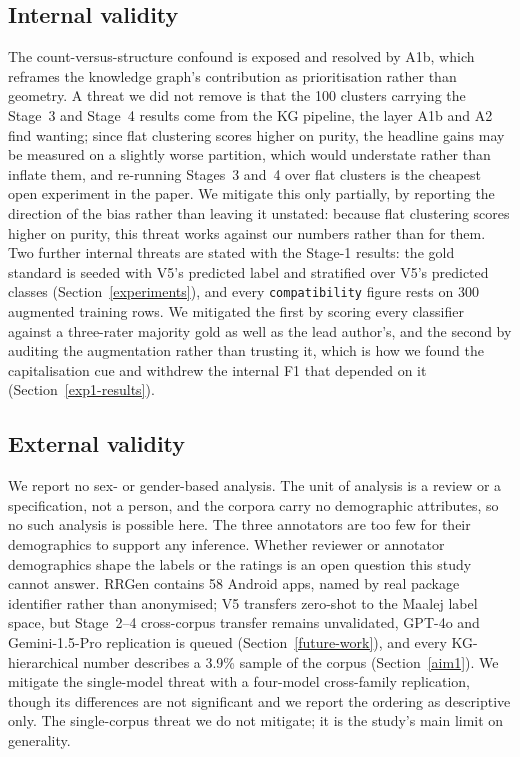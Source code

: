 \documentclass[preprint,12pt]{elsarticle}
\begin{document}
\subsection{Internal validity} The count-versus-structure confound is exposed and resolved by A1b, which reframes the knowledge graph's contribution as prioritisation rather than geometry. A threat we did not remove is that the 100 clusters carrying the Stage~3 and Stage~4 results come from the KG pipeline, the layer A1b and A2 find wanting; since flat clustering scores higher on purity, the headline gains may be measured on a slightly worse partition, which would understate rather than inflate them, and re-running Stages~3 and~4 over flat clusters is the cheapest open experiment in the paper. We mitigate this only partially, by reporting the direction of the bias rather than leaving it unstated: because flat clustering scores higher on purity, this threat works against our numbers rather than for them. Two further internal threats are stated with the Stage-1 results: the gold standard is seeded with V5's predicted label and stratified over V5's predicted classes (Section~\ref{experiments}), and every \texttt{compatibility} figure rests on 300 augmented training rows. We mitigated the first by scoring every classifier against a three-rater majority gold as well as the lead author's, and the second by auditing the augmentation rather than trusting it, which is how we found the capitalisation cue and withdrew the internal F1 that depended on it (Section~\ref{exp1-results}).
\subsection{External validity}
We report no sex- or gender-based analysis. The unit of analysis is a review or a specification,
not a person, and the corpora carry no demographic attributes, so no such analysis is possible
here. The three annotators are too few for their demographics to support any inference. Whether
reviewer or annotator demographics shape the labels or the ratings is an open question this study
cannot answer. RRGen contains 58 Android apps, named by real package identifier rather than anonymised; V5 transfers zero-shot to the Maalej label space, but Stage~2--4 cross-corpus transfer remains unvalidated, GPT-4o and Gemini-1.5-Pro replication is queued (Section~\ref{future-work}), and every KG-hierarchical number describes a 3.9\% sample of the corpus (Section~\ref{aim1}). We mitigate the single-model threat with a four-model cross-family replication, though its differences are not significant and we report the ordering as descriptive only. The single-corpus threat we do not mitigate; it is the study's main limit on generality.
\end{document}
